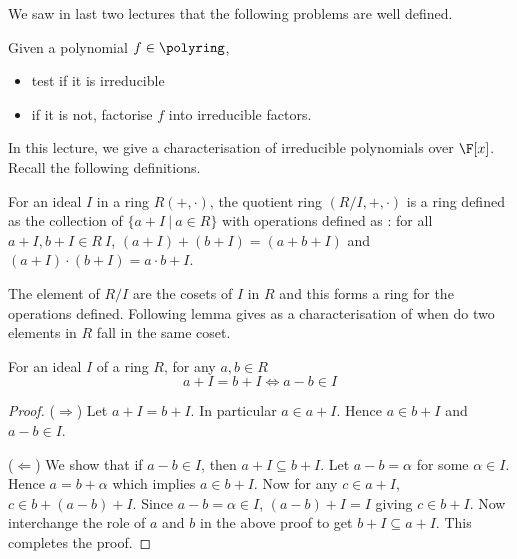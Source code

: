 

We saw in last two lectures that the following problems are well defined.
\begin{problem}
	Given a polynomial $f \in \polyring$, 
	\begin{itemize}
		\item test if it is irreducible
		\item if it is not, factorise $f$ into irreducible factors.
	\end{itemize}
\end{problem}

In this lecture, we give a characterisation of irreducible polynomials over
$\F[x]$. Recall the following definitions.

\begin{definition}
	For an ideal $I$ in a ring $R(+,\cdot)$, the quotient ring $(R/I, +
	,\cdot)$ is a ring defined as the collection of $\{a+I ~|~ a \in R\}$
	with operations defined as : for all $a+I, b+I \in R \ I$,
	$(a+I)+(b+I) = (a+b+ I)$ and $(a+I) \cdot (b+I) = a\cdot b+I$.
\end{definition}
The element of $R/I$ are the cosets of $I$ in $R$ and this forms a ring for
the operations defined.  Following lemma gives as a characterisation of when
do two elements in $R$ fall in the same coset.
\begin{lemma} \label{lem:mem-ideal}
	For an ideal $I$ of a ring $R$, for any $a,b \in R$ 
	\[ a+I = b + I \iff a-b \in I \]
\end{lemma}
\begin{proof}
	($\Longrightarrow$) Let $a+I = b+I$. In particular $a \in a+I$. Hence
	$a \in b+I$ and $a-b \in I$.

	($\Longleftarrow$) We show that if $a-b \in I$, then $a+I \subseteq
	b+I$. Let $a-b = \alpha$ for some $\alpha \in I$. Hence $a = b +
	\alpha$ which implies $a \in b+I$. Now for any $c \in a+I$, $c \in
	b+(a-b)+I$. Since $a-b = \alpha \in I$, $(a-b)+I = I$ giving $c \in
	b+I$. Now interchange the role of $a$ and $b$ in the above proof to
	get $b+I \subseteq a+I$. This completes the proof.
\end{proof}

